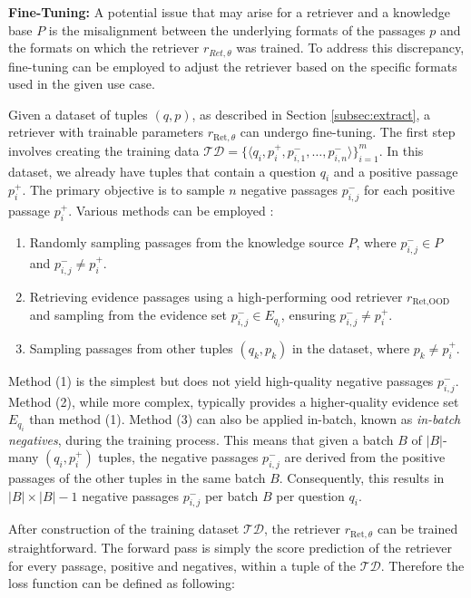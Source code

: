 \vspace{\baselineskip}

\textbf{Fine-Tuning:} A potential issue that may arise for a retriever and a knowledge base $P$ is the misalignment between the underlying formats of the passages $p$ and the formats on which the retriever $r_{Ret,\theta}$ was trained. To address this discrepancy, fine-tuning can be employed to adjust the retriever based on the specific formats used in the given use case.

Given a dataset of tuples $(q, p)$, as described in Section \ref{subsec:extract}, a retriever with trainable parameters $r_{\text{Ret}, \theta}$ can undergo fine-tuning. The first step involves creating the training data $\mathcal{TD} = \{\langle q_i, p_i^+, p_{i,1}^-, \dots, p_{i,n}^-\rangle\}_{i=1}^m$. In this dataset, we already have tuples that contain a question $q_i$ and a positive passage $p_i^+$. The primary objective is to sample $n$ negative passages $p_{i,j}^-$ for each positive passage $p_i^+$. Various methods can be employed \cite{karpukhin_dense_2020}:

\begin{enumerate}
    \item Randomly sampling passages from the knowledge source $P$, where $p_{i,j}^- \in P$ and $p_{i,j}^- \neq p_i^+$.
    \item Retrieving evidence passages using a high-performing \gls{ood} retriever $r_{\text{Ret},\text{OOD}}$ and sampling from the evidence set $p_{i,j}^- \in E_{q_i}$, ensuring $p_{i,j}^- \neq p_i^+$.
    \item Sampling passages from other tuples $(q_k,p_k)$ in the dataset, where $p_k \neq p_i^+$.
\end{enumerate}

Method (1) is the simplest but does not yield high-quality negative passages $p_{i,j}^-$. Method (2), while more complex, typically provides a higher-quality evidence set $E_{q_i}$ than method (1). Method (3) can also be applied in-batch, known as \textit{in-batch negatives}, during the training process. This means that given a batch $B$ of $|B|$-many $(q_i,p_i^+)$ tuples, the negative passages $p_{i,j}^-$ are derived from the positive passages of the other tuples in the same batch $B$. Consequently, this results in $|B| \times |B| - 1$ negative passages $p_{i,j}^-$ per batch $B$ per question $q_i$.

After construction of the training dataset $\mathcal{TD}$, the retriever $r_{\text{Ret}, \theta}$ can be trained straightforward. The forward pass is simply the score prediction of the retriever for every passage, positive and negatives, within a tuple of the $\mathcal{TD}$. Therefore the loss function can be defined as following:

